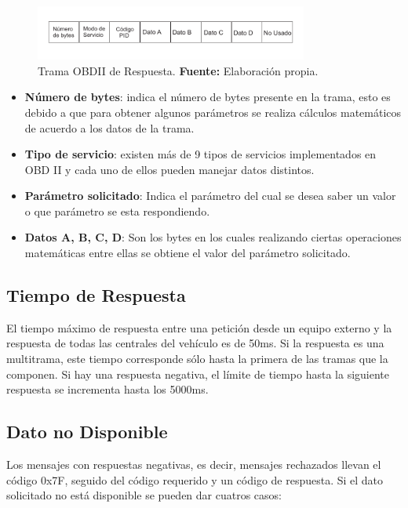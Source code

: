 \begin{figure}[H]
	\centering
		\includegraphics[width=0.8\textwidth]{./Cap3imagen/TramaOBDIIrespuesta.pdf}
	\caption[Trama OBDII de Respuesta.]{Trama OBDII de Respuesta.\textbf{ Fuente:} Elaboración propia.}
	\label{TOBDR} %
\end{figure}

\begin{itemize}
\item \textbf{Número de bytes}: indica el número de bytes presente en la trama, esto es debido a que para obtener algunos parámetros se realiza cálculos matemáticos de acuerdo a los datos de la trama.
\item \textbf{Tipo de servicio}: existen más de 9 tipos de servicios implementados en OBD II y cada uno de ellos pueden manejar datos distintos.
\item\textbf{Parámetro solicitado}: Indica el parámetro del cual se desea saber un valor o que parámetro se esta respondiendo.
\item\textbf{Datos A, B, C, D}: Son los bytes en los cuales realizando ciertas operaciones matemáticas entre ellas se obtiene el valor del parámetro solicitado.

\end{itemize}

\subsection{Tiempo de Respuesta}

El tiempo máximo de respuesta entre una petición desde un equipo externo y la respuesta de todas las centrales del vehículo es de 50ms. Si la respuesta es una multitrama, este tiempo corresponde sólo hasta la primera de las tramas que la componen. Si hay una respuesta negativa, el límite de tiempo hasta la siguiente respuesta se incrementa hasta los 5000ms.  
\subsection {Dato no Disponible}
Los mensajes con respuestas negativas, es decir, mensajes rechazados llevan el código 0x7F, seguido del código requerido y un código de respuesta. Si el dato solicitado no está disponible se pueden dar cuatros casos:

